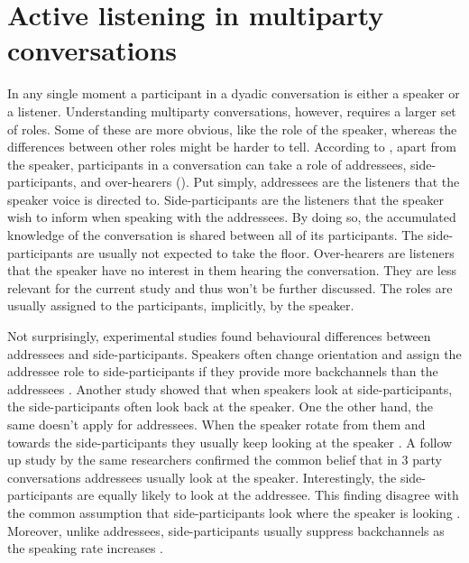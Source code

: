 \documentclass[]{simple-thesis}
\begin{document}
\section{Active listening in multiparty conversations}

In any single moment a participant in a dyadic conversation is either a speaker or a listener.
Understanding multiparty conversations, however, requires a larger set of roles.
Some of these are more obvious, like the role of the speaker, whereas the differences between other roles might be harder to tell.
According to \citeauthor{Clark1982}, apart from the speaker, participants in a conversation can take a role of addressees, side-participants, and over-hearers (\citeyear{Clark1982}).
Put simply, addressees are the listeners that the speaker voice is directed to.
Side-participants are the listeners that the speaker wish to inform when speaking with the addressees.
By doing so, the accumulated knowledge of the conversation is shared between all of its participants.
The side-participants are usually not expected to take the floor.
Over-hearers are listeners that the speaker have no interest in them hearing the conversation.
They are less relevant for the current study and thus won't be further discussed.
The roles are usually assigned to the participants, implicitly, by the speaker.

Not surprisingly, experimental studies found behavioural differences between addressees and side-participants.
Speakers often change orientation and assign the addressee role to side-participants if they provide more backchannels than the addressees \citep{Goodwin1979}.
Another study showed that when speakers look at side-participants, the side-participants often look back at the speaker.
One the other hand, the same doesn't apply for addressees.
When the speaker rotate from them and towards the side-participants they usually keep looking at the speaker \citep{Healey2009}.
A follow up study by the same researchers confirmed the common belief that in 3 party conversations addressees usually look at the speaker.
Interestingly, the side-participants are equally likely to look at the addressee.
This finding disagree with the common assumption that side-participants look where the speaker is looking \citep{Battersby2010}.
Moreover, unlike addressees, side-participants usually suppress backchannels as the speaking rate increases \citep{Healey2013}.
\end{document}
